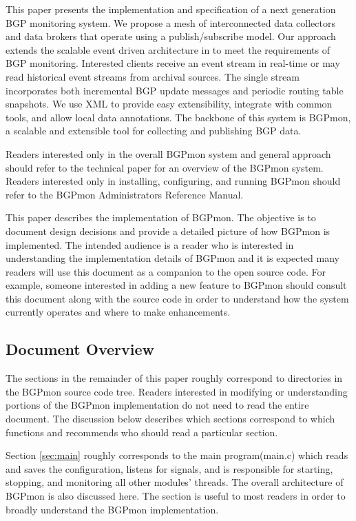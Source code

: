 This paper presents the implementation and specification of a next generation BGP monitoring system.   We propose a mesh of interconnected data collectors and data brokers that operate using a publish/subscribe model.   Our approach extends the scalable event driven architecture in \cite{seda} to meet the requirements of BGP monitoring.   Interested clients receive an event stream in real-time or may read historical event streams from archival sources.    The single stream incorporates both incremental BGP update messages and periodic routing table snapshots.   We use XML to provide easy extensibility, integrate with common tools, and allow local data annotations.      The backbone of this system is BGPmon,  a scalable and extensible tool for collecting and publishing BGP data.   

Readers interested only in the overall BGPmon system and general approach should refer to the technical paper\cite{imc08} for an overview of the BGPmon system.     Readers interested only in installing, configuring, and running BGPmon should refer to the BGPmon Administrators Reference Manual\cite{bgparm}.    

This paper describes the implementation of BGPmon.  
The objective is to document design decisions and provide a detailed picture of how BGPmon is implemented.   The intended audience is a reader who is interested in understanding the implementation details of BGPmon and it is expected many readers will use this document as a companion to the open source code.   For example, someone interested in adding a new feature to BGPmon should consult this document along with the source code in order to understand how the system currently operates and where to make enhancements.

\subsection{Document Overview}

The sections in the remainder of this paper roughly correspond to directories in the BGPmon source code tree.    Readers interested in modifying or understanding portions of the BGPmon implementation do not need to read the entire document.   The discussion below describes which sections correspond to which functions and recommends who should read a particular section.

Section \ref{sec:main} roughly corresponds to the main program(main.c) which reads and saves the configuration, listens for signals, and is responsible for starting, stopping, and monitoring all other modules' threads.  The overall architecture of BGPmon is also discussed here.  The section is useful to most readers in order to broadly understand the BGPmon implementation.

